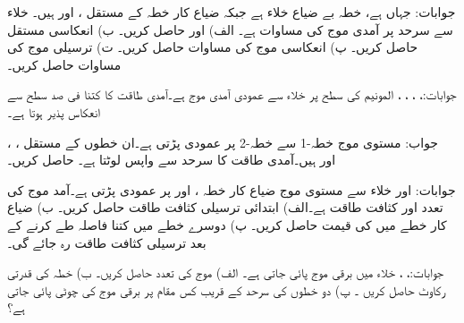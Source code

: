 جوابات: جہاں  ہے، 
خطہ  بے ضیاع خلاء ہے جبکہ ضیاع کار خطہ  کے مستقل ،  اور  ہیں۔ خلاء سے سرحد پر آمدی موج کی مساوات
  ہے۔ الف)  اور  حاصل کریں۔ ب) انعکاسی مستقل حاصل کریں۔ پ) انعکاسی موج  کی مساوات حاصل کریں۔ ت) ترسیلی موج  کی مساوات حاصل کریں۔

جوابات:، ، ،
 ، 
المونیم کی سطح  پر خلاء سے عمودی آمدی موج  ہے۔آمدی طاقت کا کتنا فی صد سطح سے انعکاس پذیر ہوتا ہے۔

جواب:
مستوی موج خطہ-1 سے خطہ-2 پر عمودی پڑتی ہے۔ان خطوں کے مستقل ، ، اور
  ہیں۔آمدی طاقت کا  سرحد سے واپس لوٹتا ہے۔ حاصل کریں۔

جوابات: اور 
خلاء سے مستوی موج ضیاع کار خطہ ،  اور  پر عمودی پڑتی ہے۔آمد موج کی تعدد  اور کثافت طاقت  ہے۔الف) ابتدائی ترسیلی کثافت طاقت حاصل کریں۔ ب) ضیاع کار خطے میں  کی قیمت حاصل کریں۔ پ) دوسرے خطے میں کتنا فاصلہ طے کرنے کے بعد ترسیلی کثافت طاقت  رہ جائے گی۔

جوابات:، ، 
خلاء  میں برقی موج  پائی جاتی ہے۔ الف) موج کی تعدد حاصل کریں۔ ب) خطہ   کی قدرتی رکاوٹ حاصل کریں ۔ پ) دو خطوں کی سرحد کے قریب کس مقام پر برقی موج کی چوٹی پائی جاتی ہے؟


